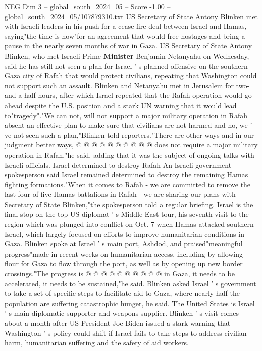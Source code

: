 \begin{textsample}{NEG Dim 3 – global\_south\_2024\_05 – Score -1.00 – global\_south\_2024\_05/107879310.txt}  \label{ex:f3_neg_358}
US Secretary of State Antony Blinken met with Israeli leaders in his push for a cease-fire deal between Israel and Hamas, saying"the time is now"for an agreement that would free hostages and bring a pause in the nearly seven months of war in Gaza.
US Secretary of State Antony Blinken, who met Israeli Prime \textbf{Minister} Benjamin Netanyahu on Wednesday, said he has still not seen a plan for Israel ' s planned offensive on the southern Gaza city of Rafah that would protect civilians, repeating that Washington could not support such an assault.
Blinken and Netanyahu met in Jerusalem for two-and-a-half hours, after which Israel repeated that the Rafah operation would go ahead despite the U.S. position and a stark UN warning that it would lead to"tragedy"."We can not, will not support a major military operation in Rafah absent an effective plan to make sure that civilians are not harmed and no, we ' ve not seen such a plan,"Blinken told reporters."There are other ways and in our judgment better ways, @ @ @ @ @ @ @ @ @ @ does not require a major military operation in Rafah,"he said, adding that it was the subject of ongoing talks with Israeli officials.
Israel determined to destroy Rafah An Israeli government spokesperson said Israel remained determined to destroy the remaining Hamas fighting formations."When it comes to Rafah - we are committed to remove the last four of five Hamas battalions in Rafah - we are sharing our plans with Secretary of State Blinken,"the spokesperson told a regular briefing.
Israel is the final stop on the top US diplomat ' s Middle East tour, his seventh visit to the region which was plunged into conflict on Oct. 7 when Hamas attacked southern Israel, which largely focused on efforts to improve humanitarian conditions in Gaza.
Blinken spoke at Israel ' s main port, Ashdod, and praised"meaningful progress"made in recent weeks on humanitarian access, including by allowing flour for Gaza to flow through the port, as well as by opening up new border crossings."The progress is @ @ @ @ @ @ @ @ @ @ in Gaza, it needs to be accelerated, it needs to be sustained,"he said.
Blinken asked Israel ' s government to take a set of specific steps to facilitate aid to Gaza, where nearly half the population are suffering catastrophic hunger, he said.
The United States is Israel ' s main diplomatic supporter and weapons supplier.
Blinken ' s visit comes about a month after US President Joe Biden issued a stark warning that Washington ' s policy could shift if Israel fails to take steps to address civilian harm, humanitarian suffering and the safety of aid workers.

\end{textsample}
